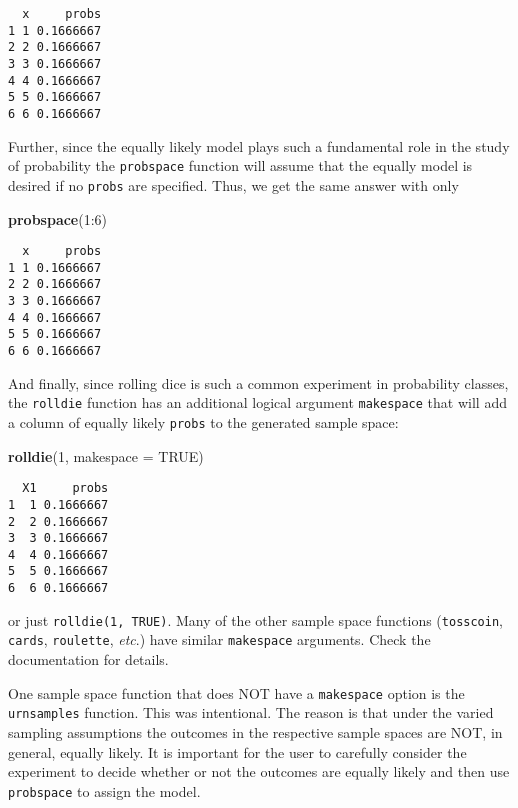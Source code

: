 \documentclass[]{book}
\newenvironment{Shaded}{\begin{snugshade}}{\end{snugshade}}
\newcommand{\KeywordTok}[1]{\textcolor[rgb]{0.13,0.29,0.53}{\textbf{{#1}}}}
\newcommand{\DataTypeTok}[1]{\textcolor[rgb]{0.13,0.29,0.53}{{#1}}}
\newcommand{\DecValTok}[1]{\textcolor[rgb]{0.00,0.00,0.81}{{#1}}}
\newcommand{\OtherTok}[1]{\textcolor[rgb]{0.56,0.35,0.01}{{#1}}}
\newcommand{\NormalTok}[1]{{#1}}
\numberwithin{equation}{chapter}
\numberwithin{figure}{chapter}
\theoremstyle{plain}
\theoremstyle{definition}
\theoremstyle{remark}
\theoremstyle{definition}
\theoremstyle{definition}
\theoremstyle{remark}
\begin{document}
\begin{verbatim}
  x     probs
1 1 0.1666667
2 2 0.1666667
3 3 0.1666667
4 4 0.1666667
5 5 0.1666667
6 6 0.1666667
\end{verbatim}

Further, since the equally likely model plays such a fundamental role in
the study of probability the \texttt{probspace} function will assume
that the equally model is desired if no \texttt{probs} are specified.
Thus, we get the same answer with only

\begin{Shaded}
\begin{Highlighting}[]
\KeywordTok{probspace}\NormalTok{(}\DecValTok{1}\NormalTok{:}\DecValTok{6}\NormalTok{) }
\end{Highlighting}
\end{Shaded}

\begin{verbatim}
  x     probs
1 1 0.1666667
2 2 0.1666667
3 3 0.1666667
4 4 0.1666667
5 5 0.1666667
6 6 0.1666667
\end{verbatim}

And finally, since rolling dice is such a common experiment in
probability classes, the \texttt{rolldie} function has an additional
logical argument \texttt{makespace} that will add a column of equally
likely \texttt{probs} to the generated sample space:

\begin{Shaded}
\begin{Highlighting}[]
\KeywordTok{rolldie}\NormalTok{(}\DecValTok{1}\NormalTok{, }\DataTypeTok{makespace =} \OtherTok{TRUE}\NormalTok{)}
\end{Highlighting}
\end{Shaded}

\begin{verbatim}
  X1     probs
1  1 0.1666667
2  2 0.1666667
3  3 0.1666667
4  4 0.1666667
5  5 0.1666667
6  6 0.1666667
\end{verbatim}

or just \texttt{rolldie(1,\ TRUE)}. Many of the other sample space
functions (\texttt{tosscoin}, \texttt{cards}, \texttt{roulette},
\emph{etc}.) have similar \texttt{makespace} arguments. Check the
documentation for details.

One sample space function that does NOT have a \texttt{makespace} option
is the \texttt{urnsamples} function. This was intentional. The reason is
that under the varied sampling assumptions the outcomes in the
respective sample spaces are NOT, in general, equally likely. It is
important for the user to carefully consider the experiment to decide
whether or not the outcomes are equally likely and then use
\texttt{probspace} to assign the model.
\end{document}
